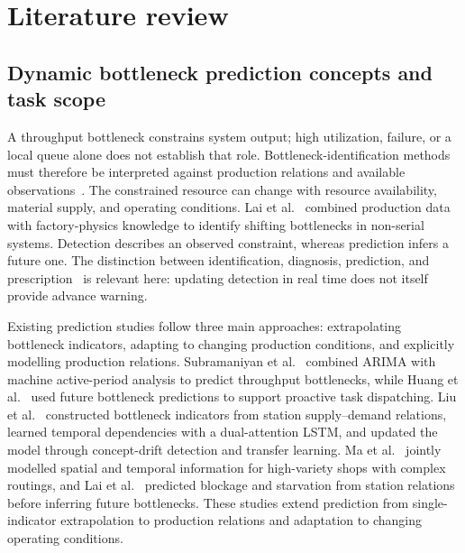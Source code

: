 \documentclass[a4paper,fleqn]{cas-dc}
\begin{document}
\section{Literature review} \label{sec:review}

\subsection{Dynamic bottleneck prediction concepts and task scope}

A throughput bottleneck constrains system output; high utilization, failure, or a local queue alone does not establish that role. Bottleneck-identification methods must therefore be interpreted against production relations and available observations~\cite{subramaniyan2023throughput}. The constrained resource can change with resource availability, material supply, and operating conditions. Lai et al.~\cite{lai2021data} combined production data with factory-physics knowledge to identify shifting bottlenecks in non-serial systems. Detection describes an observed constraint, whereas prediction infers a future one. The distinction between identification, diagnosis, prediction, and prescription~\cite{subramaniyan2021ai} is relevant here: updating detection in real time does not itself provide advance warning.





Existing prediction studies follow three main approaches: extrapolating bottleneck indicators, adapting to changing production conditions, and explicitly modelling production relations. Subramaniyan et al.~\cite{subramaniyan2018data} combined ARIMA with machine active-period analysis to predict throughput bottlenecks, while Huang et al.~\cite{huang2019proactive} used future bottleneck predictions to support proactive task dispatching. Liu et al.~\cite{liu2023lstmdam} constructed bottleneck indicators from station supply--demand relations, learned temporal dependencies with a dual-attention LSTM, and updated the model through concept-drift detection and transfer learning. Ma et al.~\cite{ma2023tusb} jointly modelled spatial and temporal information for high-variety shops with complex routings, and Lai et al.~\cite{lai2023bstan} predicted blockage and starvation from station relations before inferring future bottlenecks. These studies extend prediction from single-indicator extrapolation to production relations and adaptation to changing operating conditions.
\end{document}
